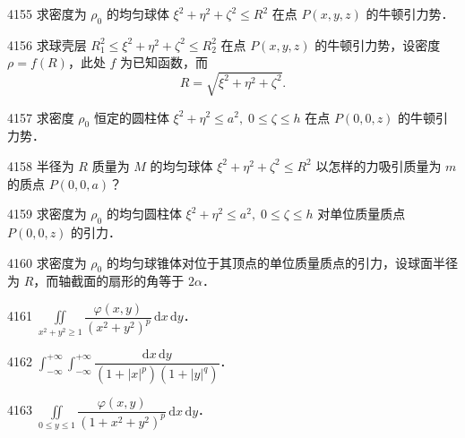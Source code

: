 \begin{prob}[M]{4155}
求密度为 $\rho_0$ 的均匀球体 $\xi^2 + \eta^2 + \zeta^2 \leqslant R^2$ 在点 $P(x,y,z)$ 的牛顿引力势．
\end{prob}

\begin{prob}[M]{4156}
求球壳层 $R_1^2 \leqslant \xi^2 + \eta^2 + \zeta^2 \leqslant R_2^2$ 在点 $P(x,y,z)$ 的牛顿引力势，设密度 $\rho = f(R)$，此处 $f$ 为已知函数，而
\[
R = \sqrt{\xi^2 + \eta^2 + \zeta^2}.
\]
\end{prob}

\begin{prob}[M]{4157}
求密度 $\rho_0$ 恒定的圆柱体 $\xi^2 + \eta^2 \leqslant a^2,\; 0 \leqslant \zeta \leqslant h$ 在点 $P(0,0,z)$ 的牛顿引力势．
\end{prob}

\begin{prob}[M]{4158}
半径为 $R$ 质量为 $M$ 的均匀球体 $\xi^2 + \eta^2 + \zeta^2 \leqslant R^2$ 以怎样的力吸引质量为 $m$ 的质点 $P(0,0,a)$？
\end{prob}

\begin{prob}[M]{4159}
求密度为 $\rho_0$ 的均匀圆柱体 $\xi^2 + \eta^2 \leqslant a^2,\; 0 \leqslant \zeta \leqslant h$ 对单位质量质点 $P(0,0,z)$ 的引力．
\end{prob}

\begin{prob}[M]{4160}
求密度为 $\rho_0$ 的均匀球锥体对位于其顶点的单位质量质点的引力，设球面半径为 $R$，而轴截面的扇形的角等于 $2\alpha$．
\end{prob}



\begin{prob}[S]{4161}
$\displaystyle\iint\limits_{x^2+y^2 \geqslant 1} \dfrac{\varphi(x,y)}{(x^2+y^2)^p} \,\mathrm{d}x\,\mathrm{d}y$．
\end{prob}

\begin{prob}[S]{4162}
$\displaystyle\int_{-\infty}^{+\infty} \int_{-\infty}^{+\infty} \dfrac{\mathrm{d}x\,\mathrm{d}y}{(1+|x|^p)(1+|y|^q)}$．
\end{prob}

\begin{prob}[S]{4163}
$\displaystyle\iint\limits_{0 \leqslant y \leqslant 1} \dfrac{\varphi(x,y)}{(1+x^2+y^2)^p} \,\mathrm{d}x\,\mathrm{d}y$．
\end{prob}

